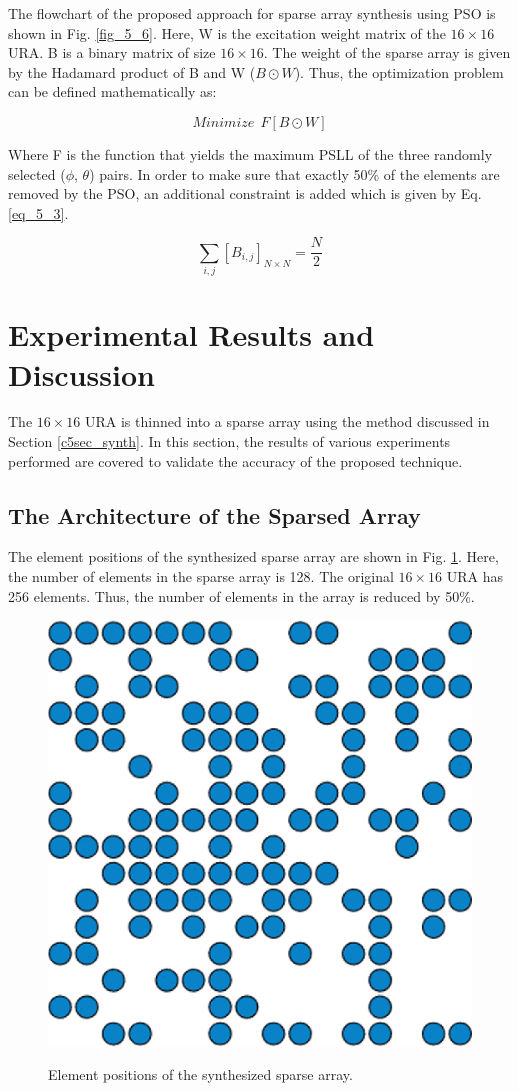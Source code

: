 The flowchart of the proposed approach for sparse array synthesis using PSO is shown in Fig. \ref{fig_5_6}. Here, W is the excitation weight matrix of the $16\times 16$ URA. B is a binary matrix of size $16\times 16$. The weight of the sparse array is given by the Hadamard product of B and W ($B \odot W$). Thus, the optimization problem can be defined mathematically as:

\begin{equation} \label{eq_5_2}
Minimize~~F[B \odot W]
\end{equation}

Where F is the function that yields the maximum PSLL of the three randomly selected ($\phi$, $\theta$) pairs. In order to make sure that exactly 50\% of the elements are removed by the PSO, an additional constraint is added which is given by Eq. \ref{eq_5_3}.

\begin{equation}\label{eq_5_3}
\sum_{i,j}{\left[B_{i,j}\right]_{N\times N}} = \frac{N}{2}
\end{equation}

\section{Experimental Results and Discussion}\label{c5sec_res}
The $16\times 16$ URA is thinned into a sparse array using the method discussed in Section \ref{c5sec_synth}. In this section, the results of various experiments performed are covered to validate the accuracy of the proposed technique.

\subsection{The Architecture of the Sparsed Array}
The element positions of the synthesized sparse array are shown in Fig. \ref{fig_5_7}. Here, the number of elements in the sparse array is 128. The original $16\times 16$ URA has 256 elements. Thus, the number of elements in the array is reduced by 50\%.

\begin{figure}
  \centering
  \includegraphics[width=0.4\linewidth]{Fig-naun_7.eps}\\
  \caption{Element positions of the synthesized sparse array.} \label{fig_5_7}
\end{figure}

